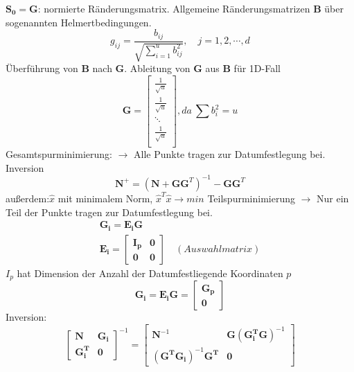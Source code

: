 \documentclass[12pt]{article}
\begin{document}
$\bm{S_0}=\bm{G}$: normierte Ränderungsmatrix.\newline
Allgemeine Ränderungsmatrizen $\bm{B}$ über sogenannten Helmertbedingungen.
\begin{equation*}
g_{ij} = \frac{b_{ij}}{\sqrt{\sum_{i = 1}^{u}b_{ij}^2}},\quad j = 1,2,\cdots, d
\end{equation*}
Überführung von $\bm{B}$ nach $\bm{G}$.\newline
Ableitung von $\bm{G}$ aus $\bm{B}$ für 1D-Fall
\begin{equation*}
\bm{G} = \begin{bmatrix}
\frac{1}{\sqrt{u}}\\
\frac{1}{\sqrt{u}}\\
\ddots\\
\frac{1}{\sqrt{u}}\\
\end{bmatrix}, da\ \sum b_i^2 = u
\end{equation*}
Gesamtspurminimierung: \newline
$\longrightarrow$ Alle Punkte tragen zur Datumfestlegung bei.\newline
Inversion
\begin{equation*}
\bm{N}^+ = (\bm{N} + \bm{G}\bm{G}^T)^{-1} - \bm{G}\bm{G}^T
\end{equation*}
außerdem:$\hat{x}$ mit minimalem Norm, $\hat{x}^T\hat{x} \longrightarrow min$ \newline
Teilspurminimierung\newline
$\rightarrow$ Nur ein Teil der Punkte tragen zur Datumfestlegung bei.
\begin{gather*}
\bm{G_i} = \bm{E_i}\bm{G} \\
\bm{E_i} = \begin{bmatrix}
\bm{I_p} & \bm{0} \\
\bm{0} & \bm{0}
\end{bmatrix}\quad (Auswahlmatrix)
\end{gather*}
$I_p$ hat Dimension der Anzahl der Datumfestliegende Koordinaten $p$
\begin{equation*}
\bm{G_i} = \bm{E_i}\bm{G} = \begin{bmatrix}
\bm{G_p} \\
\bm{0}
\end{bmatrix}
\end{equation*}
Inversion:
\begin{equation*}
\begin{bmatrix}
\bm{N} & \bm{G_i}\\
\bm{G_i^T} & \bm{0}
\end{bmatrix}^{-1} = \begin{bmatrix}
\bm{N}^{-1} & \bm{G(G_i^T G)}^{-1}\\
(\bm{G^T G_i})^{-1} \bm{G^T} & \bm{0}
\end{bmatrix}
\end{equation*}
\end{document}

